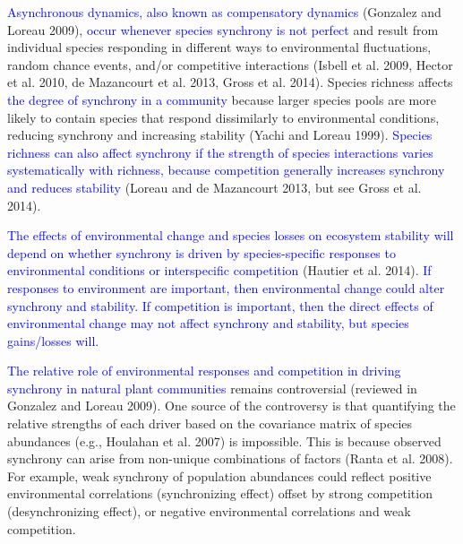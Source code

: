 \documentclass[11pt,]{article}
\begin{document}
\textcolor{blue}{Asynchronous dynamics, also known as compensatory dynamics}
(Gonzalez and Loreau 2009),
\textcolor{blue}{occur whenever species synchrony is not perfect} and
result from individual species responding in different ways to
environmental fluctuations, random chance events, and/or competitive
interactions (Isbell et al. 2009, Hector et al. 2010, {{de Mazancourt}}
et al. 2013, Gross et al. 2014). Species richness affects
\textcolor{blue}{the degree of synchrony in a community} because larger
species pools are more likely to contain species that respond
dissimilarly to environmental conditions, reducing synchrony and
increasing stability (Yachi and Loreau 1999).
\textcolor{blue}{Species richness can also affect synchrony if the strength of species interactions varies systematically with richness, because competition generally increases synchrony and reduces stability}
(Loreau and {{de Mazancourt}} 2013, but see Gross et al. 2014).

\textcolor{blue}{The effects of environmental change and species losses on ecosystem stability will depend on whether synchrony is driven by species-specific responses to environmental conditions or interspecific competition}
(Hautier et al. 2014).
\textcolor{blue}{If responses to environment are important, then environmental change could alter synchrony and stability.
If competition is important, then the direct effects of environmental change may not affect synchrony and stability, but species gains/losses will.}

\textcolor{blue}{The relative role of environmental responses and competition in driving synchrony  in natural plant communities}
remains controversial (reviewed in Gonzalez and Loreau 2009). One source
of the controversy is that quantifying the relative strengths of each
driver based on the covariance matrix of species abundances (e.g.,
Houlahan et al. 2007) is impossible. This is because observed synchrony
can arise from non-unique combinations of factors (Ranta et al. 2008).
For example, weak synchrony of population abundances could reflect
positive environmental correlations (synchronizing effect) offset by
strong competition (desynchronizing effect), or negative environmental
correlations and weak competition.
\end{document}

